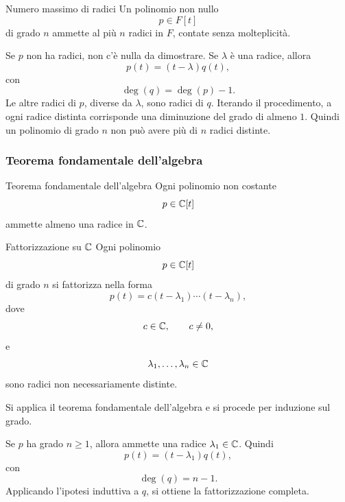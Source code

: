 \documentclass[a4paper]{article}
\begin{document}
\begin{snippetcorollary}{Numero massimo di radici}
    Un polinomio non nullo
    \[
        p\in F[t]
    \]
    di grado \(n\) ammette al più \(n\) radici in \(F\), contate senza molteplicità.
\end{snippetcorollary}

\begin{snippetproof}{}
    Se \(p\) non ha radici, non c'è nulla da dimostrare. Se \(\lambda\) è una radice, allora
    \[
        p(t)=(t-\lambda)q(t),
    \]
    con
    \[
        \deg(q)=\deg(p)-1.
    \]
    Le altre radici di \(p\), diverse da \(\lambda\), sono radici di \(q\). Iterando il procedimento, a ogni radice distinta corrisponde una diminuzione del grado di almeno \(1\). Quindi un polinomio di grado \(n\) non può avere più di \(n\) radici distinte.
\end{snippetproof}

\subsubsection{Teorema fondamentale dell'algebra}

\begin{snippettheorem}{Teorema fondamentale dell'algebra}
    Ogni polinomio non costante
    \[
        p\in\mathbb{C}[t]
    \]
    ammette almeno una radice in \(\mathbb{C}\).
\end{snippettheorem}

\begin{snippetcorollary}{Fattorizzazione su \(\mathbb{C}\)}
    Ogni polinomio
    \[
        p\in\mathbb{C}[t]
    \]
    di grado \(n\) si fattorizza nella forma
    \[
        p(t)
        =
        c(t-\lambda_1)\cdots(t-\lambda_n),
    \]
    dove
    \[
        c\in\mathbb{C},
        \qquad
        c\neq 0,
    \]
    e
    \[
        \lambda_1,\ldots,\lambda_n\in\mathbb{C}
    \]
    sono radici non necessariamente distinte.
\end{snippetcorollary}

\begin{snippetproof}{}
    Si applica il teorema fondamentale dell'algebra e si procede per induzione sul grado.

    Se \(p\) ha grado \(n\geq 1\), allora ammette una radice \(\lambda_1\in\mathbb{C}\). Quindi
    \[
        p(t)=(t-\lambda_1)q(t),
    \]
    con
    \[
        \deg(q)=n-1.
    \]
    Applicando l'ipotesi induttiva a \(q\), si ottiene la fattorizzazione completa.
\end{snippetproof}
\end{document}
